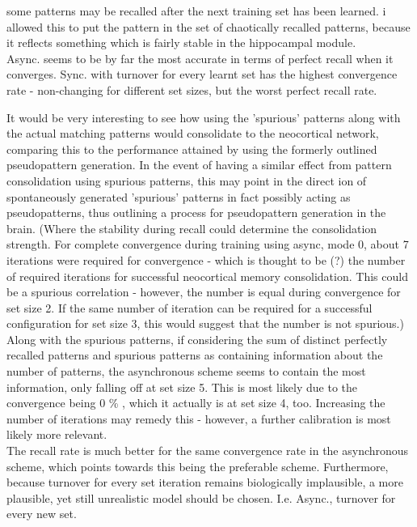 
some patterns may be recalled after the next training set has been learned. i allowed this to put the pattern in the set of chaotically recalled patterns, because it reflects something which is fairly stable in the hippocampal module.
\\

Async. seems to be by far the most accurate in terms of perfect recall when it converges. Sync. with turnover for every learnt set has the highest convergence rate - non-changing for different set sizes, but the worst perfect recall rate.

It would be very interesting to see how using the 'spurious' patterns along with the actual matching patterns would consolidate to the neocortical network, comparing this to the performance attained by using the formerly outlined pseudopattern generation. In the event of having a similar effect from pattern consolidation using spurious patterns, this may point in the direct
ion of spontaneously generated 'spurious' patterns in fact possibly acting as pseudopatterns, thus outlining a process for pseudopattern generation in the brain. (Where the stability during recall could determine the consolidation strength. For complete convergence during training using async, mode 0, about 7 iterations were required for convergence - which is thought to be (?) the number of required iterations for successful neocortical memory consolidation. This could be a spurious correlation - however, the number is equal during convergence for set size 2. If the same number of iteration can be required for a successful configuration for set size 3, this would suggest that the number is not spurious.)
\\

Along with the spurious patterns, if considering the sum of distinct perfectly recalled patterns and spurious patterns as containing information about the number of patterns, the asynchronous scheme seems to contain the most information, only falling off at set size 5. This is most likely due to the convergence being 0 \% , which it actually is at set size 4, too. Increasing the number of iterations may remedy this - however, a further calibration is most likely more relevant.
\\

The recall rate is much better for the same convergence rate in the asynchronous scheme, which points towards this being the preferable scheme. Furthermore, because turnover for every set iteration remains biologically implausible, a more plausible, yet still unrealistic model should be chosen. I.e. Async., turnover for every new set.

